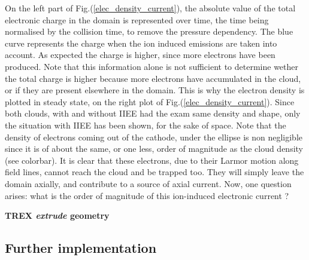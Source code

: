 On the left part of Fig.(\ref{elec_density_current}), the absolute value of the total electronic charge in the domain is represented over time, the time being normalised by the collision time, to remove the pressure dependency. The blue curve represents the charge when the ion induced emissions are taken into account. As expected the charge is higher, since more electrons have been produced. Note that this information alone is not sufficient to determine wether the total charge is higher because more electrons have accumulated in the cloud, or if they are present elsewhere in the domain. This is why the electron density is plotted in steady state, on the right plot of Fig.(\ref{elec_density_current}). Since both clouds, with and without IIEE had the exam same density and shape, only the situation with IIEE has been shown, for the sake of space. Note that the density of electrons coming out of the cathode, under the ellipse is non negligible since it is of about the same, or one less, order of magnitude as the cloud density (see colorbar). It is clear that these electrons, due to their Larmor motion along field lines, cannot reach the cloud and be trapped too. They will simply leave the domain axially, and contribute to a source of axial current. Now, one question arises: what is the order of magnitude of this ion-induced electronic current ? 

\newpage
\textbf{TREX \emph{extrude} geometry}\\



\subsection{Further implementation}